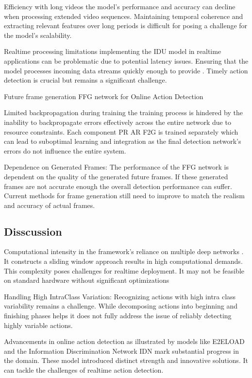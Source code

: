 {Efficiency with long videos  the model's performance and accuracy can decline when processing extended video sequences. Maintaining temporal coherence and extracting relevant features over long periods is difficult for posing a challenge for the model's scalability.

Realtime processing limitations  implementing the IDU model in realtime applications can be problematic due to potential latency issues. Ensuring that the model processes incoming data streams quickly enough to provide . Timely action detection is crucial but remains a significant challenge.

Future frame generation FFG network for Online Action Detection

Limited backpropagation during training the training process is hindered by the inability to backpropagate errors effectively across the entire network due to resource constraints. Each component PR AR F2G is trained separately which can lead to suboptimal learning and integration as the final detection network's errors do not influence the entire system.

Dependence on Generated Frames: The performance of the FFG network is dependent on the quality of the generated future frames. If these generated frames are not accurate enough the overall detection performance can suffer. Current methods for frame generation still need to improve to match the realism and accuracy of actual frames.

\subsection{Disscussion}
Computational intensity in the framework's reliance on multiple deep networks . It constructs a sliding window approach results in high computational demands. This complexity poses challenges for realtime deployment. It  may not be feasible on standard hardware without significant optimizations

Handling High IntraClass Variation: Recognizing actions with high intra class variability remains a challenge. While decomposing actions into beginning and finishing phases helps it does not fully address the issue of reliably detecting highly variable actions.

Advancements in online action detection as illustrated by models like E2ELOAD and the Information Discrimination Network IDN mark substantial progress in the domain. These model introduced distinct strength and innovative solutions. It can tackle the challenges of realtime action detection.
}
